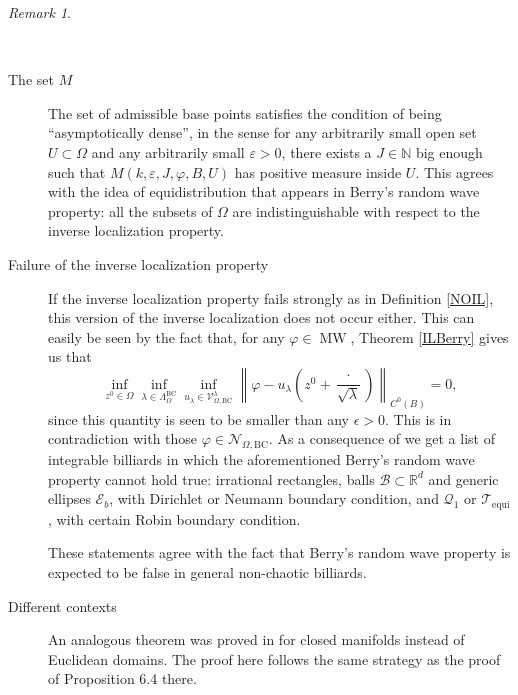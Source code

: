 \documentclass{amsart}
\theoremstyle{definition}
\theoremstyle{remark}
\newtheorem{remark}[theorem]{Remark}
\newcommand{\ep}{\varepsilon}
\newcommand{\vp}{\varphi}
\newcommand{\Om}{\Omega}
\numberwithin{equation}{section}
\theoremstyle{definition}
\theoremstyle{remark}
\DeclareMathOperator\MW{MW}
\begin{document}
\begin{remark}
	
		\begin{description}\  \\	\item[The set $M$] The set of admissible base points satisfies the condition of being ``asymptotically dense'', in the sense for any arbitrarily small open set $ U\subset \Om$ and any arbitrarily small $\ep>0$, there exists a $J\in\mathbb{N}$ big enough such that $M(k,\ep,J,\vp,B,U)$ has positive measure inside $U$. This agrees with the idea of equidistribution that appears in Berry's random wave property: all the subsets of $\Omega$ are indistinguishable with respect to the inverse localization property. 
        
		\item[Failure of the inverse localization property] If the inverse localization property fails strongly as in Definition \ref{NOIL}, this version of the inverse localization does not occur either. This can easily be seen by the fact that, for any $\varphi\in\MW$, Theorem \ref{ILBerry} gives us that \begin{equation}
		    \inf_{z^0\in\Omega}\inf_{\lambda\in \Lambda_\Omega^{\mathrm{BC}}}\inf_{u_\lambda\in\mathcal{V}_{\Omega,\mathrm{BC}}^\lambda}\left\|\varphi-u_\lambda\left(z^0+\frac{\cdot}{\sqrt{\lambda}}\right)\right\|_{C^0\left(B\right)}=0,
		\end{equation}since this quantity is seen to be smaller than any $\epsilon>0$. This is in contradiction with those  $\vp\in\mathcal{N}_{\Omega,\mathrm{BC}}$. As a consequence of  we get a list of integrable billiards in which the aforementioned Berry's random wave property cannot hold true: irrational rectangles,  balls  $\mathcal{B}\subset\mathbb{R}^d$ and generic ellipses $\mathcal{E}_b$, with Dirichlet or Neumann boundary condition, and $\mathcal{Q}_1$ or $\mathcal{T}_{\mathrm{equi}}$, with certain Robin boundary condition.
        
        These statements agree with the fact that Berry's random wave property is expected to be false in general non-chaotic billiards.
		\item[Different contexts] An analogous theorem was proved in \cite{Yo} for closed manifolds instead of Euclidean domains. The proof here follows the same strategy as the proof of Proposition 6.4 there. 	
        

\end{description}
\end{remark}
\end{document}
